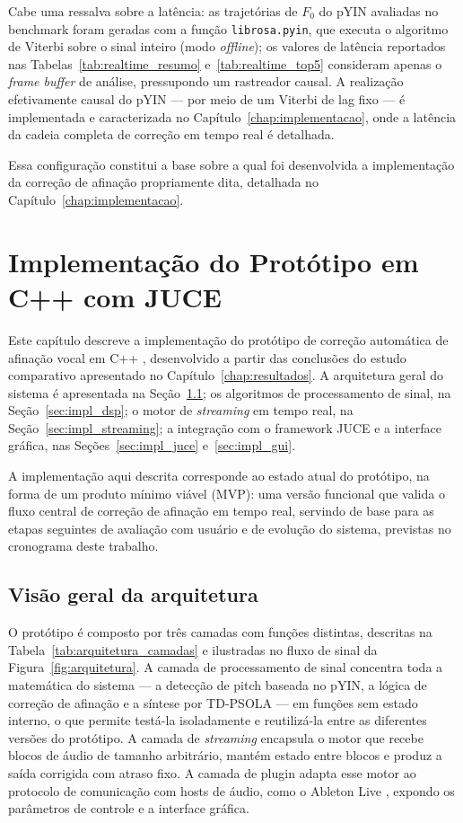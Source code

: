   Cabe uma ressalva sobre a latência: as trajetórias de $F_0$ do pYIN avaliadas
  no benchmark foram geradas com a função \texttt{librosa.pyin}, que executa o
  algoritmo de Viterbi sobre o sinal inteiro (modo \textit{offline}); os valores
  de latência reportados nas Tabelas~\ref{tab:realtime_resumo}
  e~\ref{tab:realtime_top5} consideram apenas o \textit{frame buffer} de
  análise, pressupondo um rastreador causal. A realização efetivamente causal do
  pYIN --- por meio de um Viterbi de lag fixo --- é implementada e caracterizada
  no Capítulo~\ref{chap:implementacao}, onde a latência da cadeia completa de
  correção em tempo real é detalhada.

  Essa configuração constitui a base sobre a qual foi desenvolvida a
  implementação da correção de afinação propriamente dita, detalhada no
  Capítulo~\ref{chap:implementacao}.



\chapter{\label{chap:implementacao}Implementação do Protótipo em C++ com JUCE}

Este capítulo descreve a implementação do protótipo de correção automática de afinação vocal em C++ \cite{cppreference_cpp}, desenvolvido a partir das conclusões do estudo comparativo apresentado no Capítulo~\ref{chap:resultados}. A arquitetura geral do sistema é apresentada na Seção~\ref{sec:impl_arquitetura}; os algoritmos de processamento de sinal, na Seção~\ref{sec:impl_dsp}; o motor de \textit{streaming} em tempo real, na Seção~\ref{sec:impl_streaming}; a integração com o framework JUCE e a interface gráfica, nas Seções~\ref{sec:impl_juce} e~\ref{sec:impl_gui}.

A implementação aqui descrita corresponde ao estado atual do protótipo, na forma de um produto mínimo viável (MVP): uma versão funcional que valida o fluxo central de correção de afinação em tempo real, servindo de base para as etapas seguintes de avaliação com usuário e de evolução do sistema, previstas no cronograma deste trabalho.

\section{Visão geral da arquitetura}
\label{sec:impl_arquitetura}

O protótipo é composto por três camadas com funções distintas, descritas na Tabela~\ref{tab:arquitetura_camadas} e ilustradas no fluxo de sinal da Figura~\ref{fig:arquitetura}. A camada de processamento de sinal concentra toda a matemática do sistema --- a detecção de pitch baseada no pYIN, a lógica de correção de afinação e a síntese por TD-PSOLA --- em funções sem estado interno, o que permite testá-la isoladamente e reutilizá-la entre as diferentes versões do protótipo. A camada de \textit{streaming} encapsula o motor que recebe blocos de áudio de tamanho arbitrário, mantém estado entre blocos e produz a saída corrigida com atraso fixo. A camada de plugin adapta esse motor ao protocolo de comunicação com hosts de áudio, como o Ableton Live \cite{ableton_live}, expondo os parâmetros de controle e a interface gráfica.

